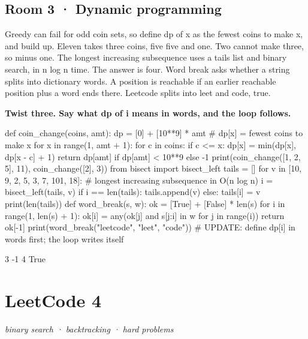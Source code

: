 \documentclass[11pt,a4paper]{report}
\begin{document}
\section*{Room 3 · Dynamic programming}
Greedy can fail for odd coin sets, so define dp of x as the fewest coins to make x, and build up. Eleven takes three coins, five five and one. Two cannot make three, so minus one. The longest increasing subsequence uses a tails list and binary search, in n log n time. The answer is four. Word break asks whether a string splits into dictionary words. A position is reachable if an earlier reachable position plus a word ends there. Leetcode splits into leet and code, true.
\begin{tcolorbox}[colback=yellow!12,colframe=orange!70!black,boxrule=0.4pt,left=4pt,right=4pt,top=2pt,bottom=2pt]\textbf{Twist three. Say what dp of i means in words, and the loop follows.}\end{tcolorbox}
\begin{Code}
def coin_change(coins, amt):
    dp = [0] + [10**9] * amt                # dp[x] = fewest coins to make x
    for x in range(1, amt + 1):
        for c in coins:
            if c <= x: dp[x] = min(dp[x], dp[x - c] + 1)
    return dp[amt] if dp[amt] < 10**9 else -1
print(coin_change([1, 2, 5], 11), coin_change([2], 3))
from bisect import bisect_left
tails = []
for v in [10, 9, 2, 5, 3, 7, 101, 18]:      # longest increasing subsequence in O(n log n)
    i = bisect_left(tails, v)
    if i == len(tails): tails.append(v)
    else: tails[i] = v
print(len(tails))
def word_break(s, w):
    ok = [True] + [False] * len(s)
    for i in range(1, len(s) + 1): ok[i] = any(ok[j] and s[j:i] in w for j in range(i))
    return ok[-1]
print(word_break("leetcode", {"leet", "code"}))
# UPDATE: define dp[i] in words first; the loop writes itself
\end{Code}
\begin{Out}
3 -1
4
True
\end{Out}
\chapter{LeetCode 4}
\textit{binary search · backtracking · hard problems}
\end{document}

